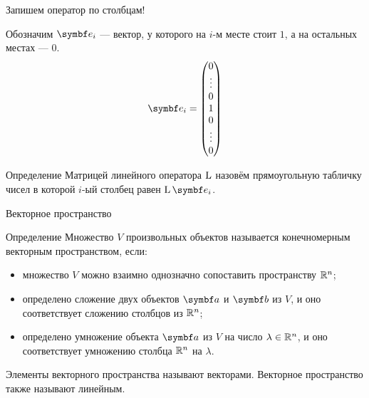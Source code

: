 \begin{frame}{Запишем оператор по столбцам!}


Обозначим $\be_i$ — вектор, у которого на $i$-м месте стоит $1$, а на остальных местах — $0$.
\[
\be_i = \begin{pmatrix}
    0 \\
    \vdots \\
    0 \\
    1 \\
    0  \\
    \vdots \\
    0 \\
\end{pmatrix}    
\]

\pause 
\begin{block}{Определение}
\alert{Матрицей линейного оператора} $\operatorname{L}$ назовём прямоугольную табличку чисел
в которой $i$-ый столбец равен $\LL \be_i$. 
\end{block}
\end{frame}








\begin{frame}{Векторное пространство}

\begin{block}{Определение} 
Множество $V$ произвольных объектов называется \alert{конечномерным векторным пространством}, если:

\begin{itemize}[<+->]
\item множество $V$ можно взаимно однозначно сопоставить пространству $\mathbb{R}^n$;
\item определено сложение двух объектов $\ba$ и $\bb$ из $V$, 
и оно соответствует сложению столбцов из $\mathbb{R}^n$;
\item определено умножение объекта $\ba$ из $V$ на число $\lambda\in \mathbb{R}^n$, 
и оно соответствует умножению столбца $\mathbb{R}^n$ на $\lambda$.
\end{itemize}
\end{block}

\pause
Элементы векторного пространства называют векторами. 
\pause
Векторное пространство также называют \alert{линейным}.

\end{frame}



